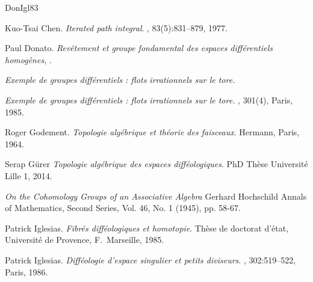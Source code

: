 \documentclass[12pt,reqno]{amsart}
\theoremstyle{article}
\begin{document}
  
  \begin{thebibliography}{DonIgl83}
    
    Kuo-Tsai Chen.
    \newblock \emph{Iterated path integral}.
    , 83(5):831--879, 1977.
    
    Paul Donato.
    \newblock \emph{Rev\^etement et groupe fondamental des espaces diff\'e\-rentiels homog\`enes},
    .
    
    \newblock\emph{Exemple de groupes différentiels : flots irrationnels sur le tore.}
    
    \bysame
    \newblock\emph{Exemple de groupes différentiels : flots irrationnels sur le tore.}
    , 301(4), Paris, 1985.
    
    Roger Godement.
    \newblock \emph{Topologie alg\'ebrique et th\'eorie des faisceaux}.
    \newblock Hermann, Paris, 1964.
    
    Serap Gürer
    \newblock \emph{Topologie algébrique des espaces difféologiques}.
    \newblock PhD Th\`ese Université Lille 1, 2014.
    
    \emph{On the Cohomology Groups of an Associative Algebra}
    Gerhard Hochschild
    \newblock Annals of Mathematics, Second Series, Vol. 46, No. 1 (1945), pp. 58-67.
    
    Patrick Iglesias.
    \newblock \emph{Fibr\'es diff\'eologiques et homotopie}.
    \newblock Th\`ese de doctorat d'\'etat, Universit\'e de Provence, F.~Marseille, 1985.
    
    Patrick Iglesias.
    \newblock \emph{Diff\'eologie d'espace singulier et petits diviseurs}.
    , 302:519--522, Paris, 1986.
    

\end{thebibliography}
\end{document}
